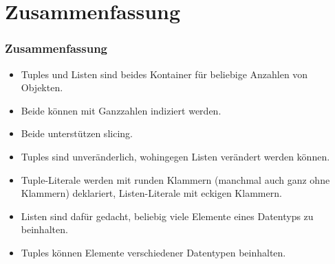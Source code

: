\documentclass[aspectratio=169,mathserif,notheorems]{beamer}%
\begin{document}
\section{Zusammenfassung}%
%
\begin{frame}%
\frametitle{Zusammenfassung}%
\begin{itemize}%
\item Tuples und Listen sind beides Kontainer für beliebige Anzahlen von Objekten.%
%
\item<2-> Beide können mit Ganzzahlen indiziert werden.%
%
\item<3-> Beide unterstützen slicing.%
%
\item<4-> Tuples sind unveränderlich, wohingegen Listen verändert werden können.%
%
\item<5-> Tuple-Literale werden mit runden Klammern (manchmal auch ganz ohne Klammern) deklariert, Listen-Literale mit eckigen Klammern.%
%
\item<6-> Listen sind dafür gedacht, beliebig viele Elemente eines Datentyps zu beinhalten.%
%
\item<7-> Tuples können Elemente verschiedener Datentypen beinhalten.%
%
\end{itemize}%
\end{frame}%
%
\endPresentation%
\end{document}
